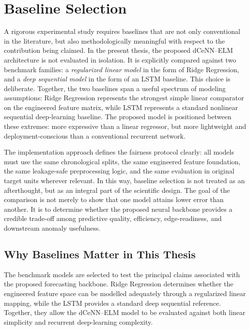 \section{Baseline Selection}
\label{sec:baseline_selection}

A rigorous experimental study requires baselines that are not only conventional in the literature, but also methodologically meaningful with respect to the contribution being claimed. In the present thesis, the proposed dCeNN--ELM architecture is not evaluated in isolation. It is explicitly compared against two benchmark families: a \emph{regularized linear model} in the form of Ridge Regression, and a \emph{deep sequential model} in the form of an LSTM baseline. This choice is deliberate. Together, the two baselines span a useful spectrum of modeling assumptions: Ridge Regression represents the strongest simple linear comparator on the engineered feature matrix, while LSTM represents a standard nonlinear sequential deep-learning baseline. The proposed model is positioned between these extremes: more expressive than a linear regressor, but more lightweight and deployment-conscious than a conventional recurrent network.

The implementation approach defines the fairness protocol clearly: all models must use the same chronological splits, the same engineered feature foundation, the same leakage-safe preprocessing logic, and the same evaluation in original target units wherever relevant. In this way, baseline selection is not treated as an afterthought, but as an integral part of the scientific design. The goal of the comparison is not merely to show that one model attains lower error than another. It is to determine whether the proposed neural backbone provides a credible trade-off among predictive quality, efficiency, edge-readiness, and downstream anomaly usefulness.


\subsection{Why Baselines Matter in This Thesis}

The benchmark models are selected to test the principal claims associated with
the proposed forecasting backbone. Ridge Regression determines whether the
engineered feature space can be modelled adequately through a regularized linear
mapping, while the LSTM provides a standard deep sequential reference. Together,
they allow the dCeNN--ELM model to be evaluated against both linear simplicity and
recurrent deep-learning complexity.

